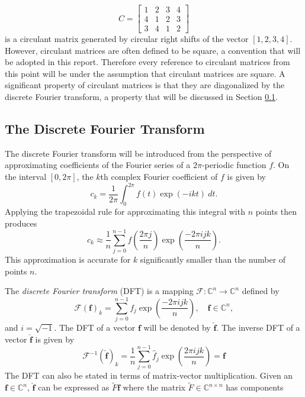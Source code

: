 \documentclass[12pt]{article}
\begin{document}
\[C = \begin{bmatrix}
1 & 2 & 3 & 4 \\
4 & 1 & 2 & 3 \\
3 & 4 & 1 & 2
\end{bmatrix}\] 
is a circulant matrix generated by circular right shifts of the vector $[1,2,3,4]$. However, circulant matrices are often defined to be square, a convention that will be adopted in this report. Therefore every reference to circulant matrices from this point will be under the assumption that circulant matrices are square. A significant property of circulant matrices is that they are diagonalized by the discrete Fourier transform, a property that will be discussed in Section \ref{The Discrete Fourier Transform}.

\subsection{The Discrete Fourier Transform} \label{The Discrete Fourier Transform}
The discrete Fourier transform will be introduced from the perspective of approximating coefficients of the Fourier series of a $2\pi$-periodic function $f$. On the interval $[0,2\pi]$, the $k$th complex Fourier coefficient of $f$ is given by
\[c_k = \frac{1}{2\pi}\int_0^{2\pi} f(t)\exp(-ikt)\:dt.\]
Applying the trapezoidal rule for approximating this integral with $n$ points then produces
\[c_k \approx \frac{1}{n}\sum_{j = 0}^{n-1} f\left(\frac{2\pi{j}}{n}\right)\exp\left(\frac{-2\pi{ijk}}{n}\right).\]
This approximation is accurate for $k$ significantly smaller than the number of points $n$. \par 
The \textit{discrete Fourier transform} (DFT) is a mapping $\mathcal{F}:\mathbb{C}^n \rightarrow \mathbb{C}^n$ defined by
\begin{equation}
\mathcal{F}(\mathbf{f})_k = \sum_{j=0}^{n-1} f_{j}\exp\left(\frac{-2\pi{ijk}}{n}\right), \quad \mathbf{f}\in\mathbb{C}^n,
\label{Eq_DFT}
\end{equation}
and $i = \sqrt{-1}$. The DFT of a vector $\mathbf{f}$ will be denoted by $\widehat{\mathbf{f}}$. The inverse DFT of a vector $\widehat{\mathbf{f}}$ is given by
\begin{equation}
\mathcal{F}^{-1}(\widehat{\mathbf{f}})_k = \frac{1}{n}\sum_{j=0}^{n-1} \widehat{f}_j\exp\left(\frac{2\pi{ijk}}{n}\right) = \mathbf{f}
\end{equation}
The DFT can also be stated in terms of matrix-vector multiplication. Given an $\mathbf{f} \in \mathbb{C}^n$, $\widehat{\mathbf{f}}$ can be expressed as $\widetilde{F}\mathbf{f}$ where the matrix $\widetilde{F}\in\mathbb{C}^{n\times{n}}$ has components
\end{document}
